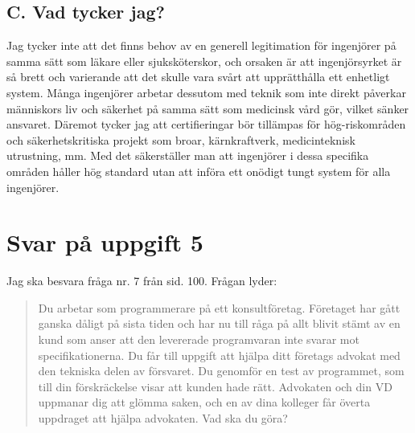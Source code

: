 \documentclass[a4paper,12pt]{article}
\begin{document}
\subsection*{C. Vad tycker jag?}
Jag tycker inte att det finns behov av en generell legitimation för ingenjörer på samma sätt som
läkare eller sjuksköterskor, och orsaken är att ingenjörsyrket är så brett och
varierande att det skulle vara svårt att upprätthålla ett enhetligt
system. Många ingenjörer arbetar dessutom med teknik
som inte direkt påverkar människors liv och säkerhet på samma sätt som
medicinsk vård gör, vilket sänker ansvaret.
%
Däremot tycker jag att certifieringar bör tillämpas för hög-riskområden och
säkerhetskritiska projekt som broar, kärnkraftverk, medicinteknisk
utrustning, mm. Med det säkerställer man att ingenjörer i dessa specifika
områden håller hög standard utan att införa ett onödigt tungt system för alla
ingenjörer.
%
\section*{Svar på uppgift 5}
Jag ska besvara fråga nr. 7 från \cite{komp} sid. 100. Frågan lyder:
\begin{quote}
    Du arbetar som programmerare på ett konsultföretag. Företaget har gått
    ganska dåligt på sista tiden och har nu till råga på allt blivit stämt av
    en kund som anser att den levererade programvaran inte svarar mot
    speciﬁkationerna. Du får till uppgift att hjälpa ditt företags advokat med
    den tekniska delen av försvaret. Du genomför en test av programmet, som
    till din förskräckelse visar att kunden hade rätt. Advokaten och din VD
    uppmanar dig att glömma saken, och en av dina kolleger får överta uppdraget
    att hjälpa advokaten. Vad ska du göra?
\end{quote}
%
\end{document}
